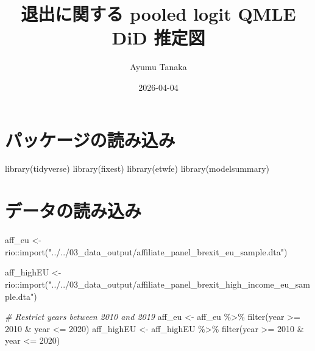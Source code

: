 \documentclass[
]{article}
\title{退出に関する pooled logit QMLE DiD 推定図}
\author{Ayumu Tanaka}
\date{2026-04-04}
\newenvironment{Shaded}{\begin{snugshade}}{\end{snugshade}}
\newcommand{\CommentTok}[1]{\textcolor[rgb]{0.56,0.35,0.01}{\textit{#1}}}
\newcommand{\DecValTok}[1]{\textcolor[rgb]{0.00,0.00,0.81}{#1}}
\newcommand{\FunctionTok}[1]{\textcolor[rgb]{0.00,0.00,0.00}{#1}}
\newcommand{\NormalTok}[1]{#1}
\newcommand{\OtherTok}[1]{\textcolor[rgb]{0.56,0.35,0.01}{#1}}
\newcommand{\SpecialCharTok}[1]{\textcolor[rgb]{0.00,0.00,0.00}{#1}}
\newcommand{\StringTok}[1]{\textcolor[rgb]{0.31,0.60,0.02}{#1}}
\begin{document}
\maketitle

{
\setcounter{tocdepth}{2}
\tableofcontents
}
\hypertarget{ux30d1ux30c3ux30b1ux30fcux30b8ux306eux8aadux307fux8fbcux307f}{%
\section{パッケージの読み込み}\label{ux30d1ux30c3ux30b1ux30fcux30b8ux306eux8aadux307fux8fbcux307f}}

\begin{Shaded}
\begin{Highlighting}[]
\FunctionTok{library}\NormalTok{(tidyverse)}
\FunctionTok{library}\NormalTok{(fixest)}
\FunctionTok{library}\NormalTok{(etwfe)}
\FunctionTok{library}\NormalTok{(modelsummary)}
\end{Highlighting}
\end{Shaded}

\hypertarget{ux30c7ux30fcux30bfux306eux8aadux307fux8fbcux307f}{%
\section{データの読み込み}\label{ux30c7ux30fcux30bfux306eux8aadux307fux8fbcux307f}}

\begin{Shaded}
\begin{Highlighting}[]
\NormalTok{aff\_eu }\OtherTok{\textless{}{-}}\NormalTok{ rio}\SpecialCharTok{::}\FunctionTok{import}\NormalTok{(}\StringTok{"../../03\_data\_output/affiliate\_panel\_brexit\_eu\_sample.dta"}\NormalTok{)}

\NormalTok{aff\_highEU }\OtherTok{\textless{}{-}}\NormalTok{ rio}\SpecialCharTok{::}\FunctionTok{import}\NormalTok{(}\StringTok{"../../03\_data\_output/affiliate\_panel\_brexit\_high\_income\_eu\_sample.dta"}\NormalTok{)}



\CommentTok{\# Restrict years between 2010 and 2019}
\NormalTok{aff\_eu }\OtherTok{\textless{}{-}}\NormalTok{ aff\_eu }\SpecialCharTok{\%\textgreater{}\%}             \FunctionTok{filter}\NormalTok{(year }\SpecialCharTok{\textgreater{}=} \DecValTok{2010} \SpecialCharTok{\&}\NormalTok{ year }\SpecialCharTok{\textless{}=} \DecValTok{2020}\NormalTok{)}
\NormalTok{aff\_highEU }\OtherTok{\textless{}{-}}\NormalTok{ aff\_highEU }\SpecialCharTok{\%\textgreater{}\%}     \FunctionTok{filter}\NormalTok{(year }\SpecialCharTok{\textgreater{}=} \DecValTok{2010} \SpecialCharTok{\&}\NormalTok{ year }\SpecialCharTok{\textless{}=} \DecValTok{2020}\NormalTok{)}
\end{Highlighting}
\end{Shaded}
\end{document}
